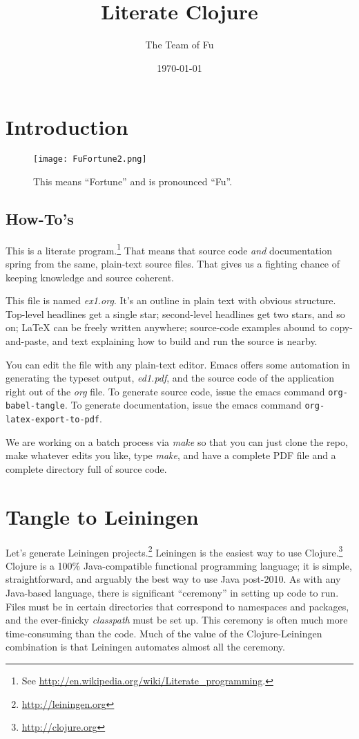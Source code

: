 \documentclass[11pt]{article}
\author{The Team of Fu}
\date{\today}
\title{Literate Clojure}
\begin{document}
\maketitle
\tableofcontents


\section{Introduction}
\label{sec-1}
\begin{figure}
  \centering
  \texttt{[image: FuFortune2.png]}
  \caption{\label{fig:fufortune}This means ``Fortune'' and is pronounced ``Fu''.}
\end{figure}

\subsection{How-To's}
\label{sec-1-1}
This is a literate program.\footnote{See
  \url{http://en.wikipedia.org/wiki/Literate_programming}.} That means that
source code \emph{and} documentation spring from the same, plain-text
source files. That gives us a fighting chance of keeping knowledge
and source coherent.

This file is named \emph{ex1.org}. It's an outline in plain text with
obvious structure. Top-level headlines get a single star;
second-level headlines get two stars, and so on; \LaTeX{} can be
freely written anywhere; source-code examples abound to
copy-and-paste, and text explaining how to build and run the source
is nearby.

You can edit the file with any plain-text editor. Emacs offers some
automation in generating the typeset output, \emph{ed1.pdf}, and the
source code of the application right out of the \emph{org} file. To
generate source code, issue the emacs command
\verb|org-babel-tangle|. To generate documentation, issue the emacs
command \verb|org-latex-export-to-pdf|.

We are working on a batch process via \emph{make} so that you can just
clone the repo, make whatever edits you like, type \emph{make}, and have
a complete PDF file and a complete directory full of source code.
\section{Tangle to Leiningen}
\label{sec-2}
Let's generate Leiningen projects.\footnote{\url{http://leiningen.org}}
Leiningen is the easiest way to use Clojure.\footnote{\url{http://clojure.org}}
Clojure is a 100\% Java-compatible functional programming language;
it is simple, straightforward, and arguably the best way to use Java
post-2010. As with any Java-based language, there is significant
``ceremony'' in setting up code to run. Files must be in certain
directories that correspond to namespaces and packages, and the
ever-finicky \emph{classpath} must be set up. This ceremony is often much
more time-consuming than the code. Much of the value of the
Clojure-Leiningen combination is that Leiningen automates almost all
the ceremony.
\end{document}
